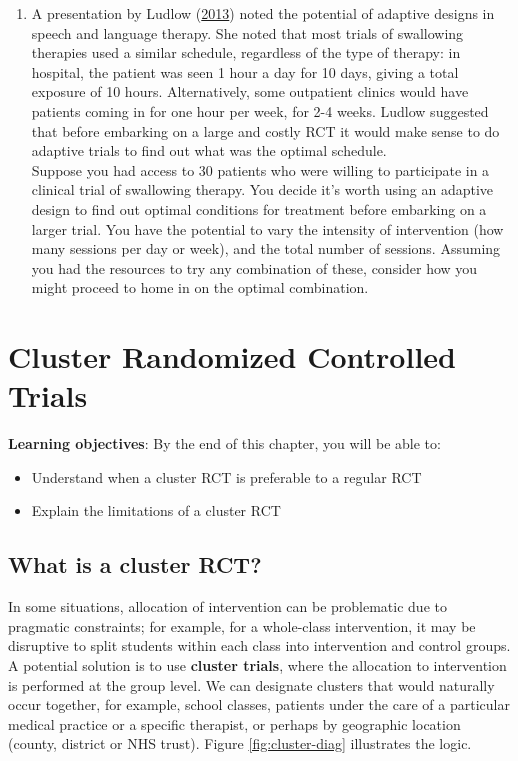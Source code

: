 \documentclass{krantz}
\providecommand{\tightlist}{%
\setlength{\itemsep}{0pt}\setlength{\parskip}{0pt}}
\begin{document}
\begin{enumerate}
\def\labelenumi{\arabic{enumi}.}
\tightlist
\item
  A presentation by Ludlow (\protect\hyperlink{ref-ludlow2013}{2013}) noted the potential of adaptive designs in speech and language therapy. She noted that most trials of swallowing therapies used a similar schedule, regardless of the type of therapy: in hospital, the patient was seen 1 hour a day for 10 days, giving a total exposure of 10 hours. Alternatively, some outpatient clinics would have patients coming in for one hour per week, for 2-4 weeks. Ludlow suggested that before embarking on a large and costly RCT it would make sense to do adaptive trials to find out what was the optimal schedule.\\
  Suppose you had access to 30 patients who were willing to participate in a clinical trial of swallowing therapy. You decide it's worth using an adaptive design to find out optimal conditions for treatment before embarking on a larger trial. You have the potential to vary the intensity of intervention (how many sessions per day or week), and the total number of sessions. Assuming you had the resources to try any combination of these, consider how you might proceed to home in on the optimal combination.
\end{enumerate}

\hypertarget{cluster}{%
\chapter{Cluster Randomized Controlled Trials}\label{cluster}}

\textbf{Learning objectives}: By the end of this chapter, you will be able to:

\begin{itemize}
\item
  Understand when a cluster RCT is preferable to a regular RCT
\item
  Explain the limitations of a cluster RCT
\end{itemize}

\hypertarget{what-is-a-cluster-rct}{%
\section{What is a cluster RCT?}\label{what-is-a-cluster-rct}}

In some situations, allocation of intervention can be problematic due to pragmatic constraints; for example, for a whole-class intervention, it may be disruptive to split students within each class into intervention and control groups. A potential solution is to use \textbf{cluster trials}, where the allocation to intervention is performed at the group level. We can designate clusters that would naturally occur together, for example, school classes, patients under the care of a particular medical practice or a specific therapist, or perhaps by geographic location (county, district or NHS trust). Figure \ref{fig:cluster-diag} illustrates the logic.\\
\end{document}
